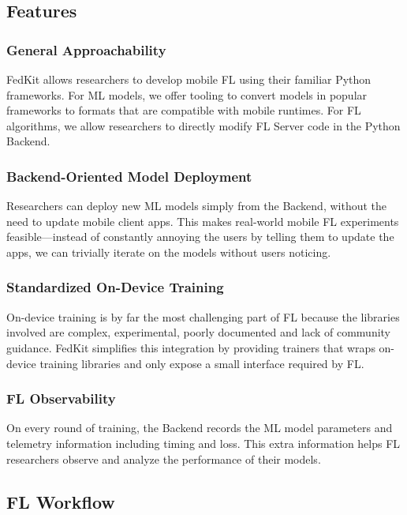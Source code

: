 \documentclass[letterpaper]{article} %
\begin{document}
\subsection{Features}


\subsubsection{General Approachability}
FedKit allows researchers to develop mobile FL
using their familiar Python frameworks.
For ML models, we offer tooling to convert models in popular frameworks to
formats that are compatible with mobile runtimes.
For FL algorithms, we allow researchers to directly modify FL Server code in
the Python Backend.

\newcommand{\backendorin}{Backend-Oriented Model Deployment}
\subsubsection{\backendorin}
Researchers can deploy new ML models simply from the Backend,
without the need to update mobile client apps.
This makes real-world mobile FL experiments feasible---instead of constantly
annoying the users by telling them to update the apps,
we can trivially iterate on the models without users noticing.

\subsubsection{Standardized On-Device Training}
On-device training is by far the most challenging part of FL because
the libraries involved are complex, experimental, poorly documented
and lack of community guidance.
FedKit simplifies this integration by providing trainers
that wraps on-device training libraries and
only expose a small interface required by FL.

\subsubsection{FL Observability}
On every round of training, the Backend records the ML model parameters and
telemetry information including timing and loss.
This extra information helps FL researchers observe and analyze
the performance of their models.

\subsection{FL Workflow}
\end{document}
